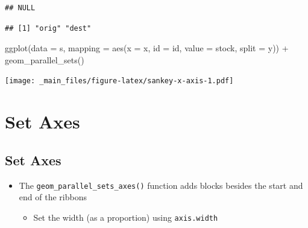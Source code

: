 \documentclass[
]{book}
\newenvironment{Shaded}{\begin{snugshade}}{\end{snugshade}}
\newcommand{\AttributeTok}[1]{\textcolor[rgb]{0.77,0.63,0.00}{#1}}
\newcommand{\FunctionTok}[1]{\textcolor[rgb]{0.00,0.00,0.00}{#1}}
\newcommand{\NormalTok}[1]{#1}
\newcommand{\OtherTok}[1]{\textcolor[rgb]{0.56,0.35,0.01}{#1}}
\newcommand{\SpecialCharTok}[1]{\textcolor[rgb]{0.00,0.00,0.00}{#1}}
\providecommand{\tightlist}{%
  \setlength{\itemsep}{0pt}\setlength{\parskip}{0pt}}
\begin{document}
\begin{verbatim}
## NULL
\end{verbatim}

\begin{Shaded}
\end{Shaded}

\begin{verbatim}
## [1] "orig" "dest"
\end{verbatim}

\begin{Shaded}
\begin{Highlighting}[]
\FunctionTok{ggplot}\NormalTok{(}\AttributeTok{data =}\NormalTok{ s,}
       \AttributeTok{mapping =} \FunctionTok{aes}\NormalTok{(}\AttributeTok{x =}\NormalTok{ x, }\AttributeTok{id =}\NormalTok{ id, }\AttributeTok{value =}\NormalTok{ stock, }\AttributeTok{split =}\NormalTok{ y)) }\SpecialCharTok{+}
  \FunctionTok{geom\_parallel\_sets}\NormalTok{()}
\end{Highlighting}
\end{Shaded}

\texttt{[image: \_main\_files/figure-latex/sankey-x-axis-1.pdf]}

\hypertarget{set-axes}{%
\section{Set Axes}\label{set-axes}}

\hypertarget{set-axes-1}{%
\subsection{Set Axes}\label{set-axes-1}}

\begin{itemize}
\tightlist
\item
  The \texttt{geom\_parallel\_sets\_axes()} function adds blocks besides the start and end of the ribbons

  \begin{itemize}
  \tightlist
  \item
    Set the width (as a proportion) using \texttt{axis.width}
  \end{itemize}
\end{itemize}
\end{document}
